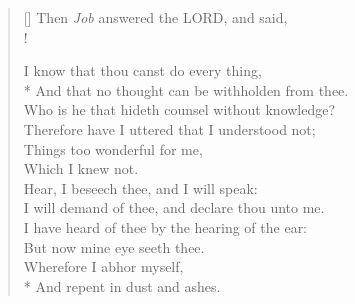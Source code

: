 \documentclass[MAIN]{subfiles}
\begin{document}
\begin{verse}[\versewidth]
Then \emph{Job} answered the {\hge LORD}, and said,\\!

I know that thou canst do every thing,\\*
\vin And that no thought can be withholden from thee.\\
Who is he that hideth counsel without knowledge?\\
\vin Therefore have I uttered that I understood not;\\
Things too wonderful for me,\\
\vin Which I knew not.\\
Hear, I beseech thee, and I will speak:\\
\vin I will demand of thee, and declare thou unto me.\\
I have heard of thee by the hearing of the ear:\\
\vin But now mine eye seeth thee.\\
Wherefore I abhor myself,\\*
\vin And repent in dust and ashes.
\end{verse}
\end{document}
